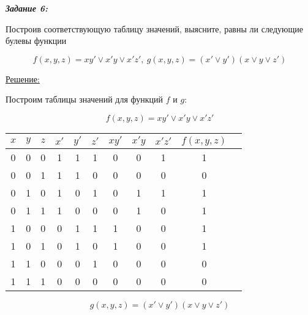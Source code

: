 \documentclass[11pt]{article}
\begin{document}
\textit{\textbf{Задание 6:}}

Построив соответствующую таблицу значений, выясните, равны ли
следующие булевы функции

$$f(x,y,z)=xy' \lor x'y \lor x'z',
\ g(x,y,z)=(x' \lor y')(x \lor y \lor z')$$

\underline{Решение:}

Построим таблицы значений для функций $f$ и $g$:

$$f(x,y,z)=x y' \lor x' y \lor x'z'$$

\begin{center}
        \begin{tabular}{ |c|c|c|c|c|c|c|c|c|c|c| }
                \hline
                $x$ & $y$ & $z$ & $x'$ & $y'$ & $z'$ & $xy'$ & $x'y$ & $x' z'$ & $f(x,y,z)$\\
                \hline
                0 & 0 & 0 & 1 & 1 & 1 & 0 & 0 & 1 & 1\\
                \hline
                0 & 0 & 1 & 1 & 1 & 0 & 0 & 0 & 0 & 0\\
                \hline
                0 & 1 & 0 & 1 & 0 & 1 & 0 & 1 & 1 & 1\\
                \hline
                0 & 1 & 1 & 1 & 0 & 0 & 0 & 1 & 0 & 1\\
                \hline
                1 & 0 & 0 & 0 & 1 & 1 & 1 & 0 & 0 & 1\\
                \hline
                1 & 0 & 1 & 0 & 1 & 0 & 1 & 0 & 0 & 1\\
                \hline
                1 & 1 & 0 & 0 & 0 & 1 & 0 & 0 & 0 & 0\\
                \hline
                1 & 1 & 1 & 0 & 0 & 0 & 0 & 0 & 0 & 0\\
                \hline
        \end{tabular}
\end{center}

$$g(x,y,z)=(x' \lor y')(x \lor y \lor z')$$
\end{document}
